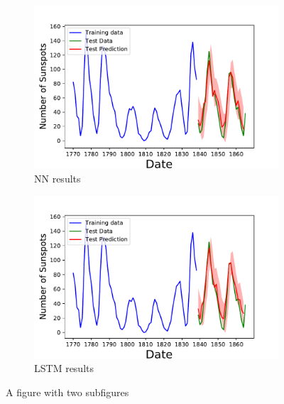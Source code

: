 \documentclass[10pt,a4paper]{article}
\begin{document}
\newpage
\begin{figure}[h]
\centering
\begin{subfigure}{.5\textwidth}
  \centering
  \includegraphics[scale=0.41]{Sunspot_Forecast_NN.pdf}
  \caption{NN results}
  \label{fig:sub1}
\end{subfigure}%
\begin{subfigure}{.5\textwidth}
  \centering
  \includegraphics[scale=0.41]{Sunspot_Forecast_LSTN.pdf}
  \caption{LSTM results}
  \label{fig:sub2}
\end{subfigure}
\caption{A figure with two subfigures}
\label{fig:test}
\end{figure}
\end{document}
